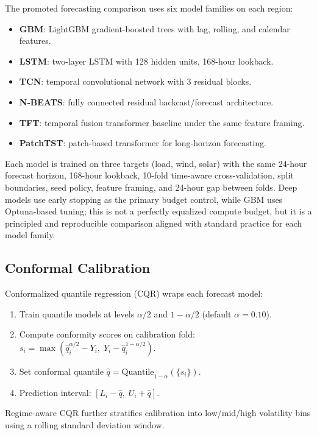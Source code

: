 \documentclass[11pt,a4paper,twocolumn]{article}
\begin{document}
The promoted forecasting comparison uses six model families on each region:
\begin{itemize}[leftmargin=*,topsep=2pt,itemsep=1pt]
  \item \textbf{GBM}: LightGBM gradient-boosted trees with lag, rolling, and calendar features.
  \item \textbf{LSTM}: two-layer LSTM with 128 hidden units, 168-hour lookback.
  \item \textbf{TCN}: temporal convolutional network with 3 residual blocks.
  \item \textbf{N-BEATS}: fully connected residual backcast/forecast architecture.
  \item \textbf{TFT}: temporal fusion transformer baseline under the same feature framing.
  \item \textbf{PatchTST}: patch-based transformer for long-horizon forecasting.
\end{itemize}
Each model is trained on three targets (load, wind, solar) with the same 24-hour forecast horizon, 168-hour lookback, 10-fold time-aware cross-validation, split boundaries, seed policy, feature framing, and 24-hour gap between folds. Deep models use early stopping as the primary budget control, while GBM uses Optuna-based tuning; this is not a perfectly equalized compute budget, but it is a principled and reproducible comparison aligned with standard practice for each model family.

\subsection{Conformal Calibration}

Conformalized quantile regression (CQR) wraps each forecast model:
\begin{enumerate}[leftmargin=*,topsep=2pt,itemsep=1pt]
  \item Train quantile models at levels $\alpha/2$ and $1-\alpha/2$ (default $\alpha=0.10$).
  \item Compute conformity scores on calibration fold: $s_i = \max(\hat{q}_i^{\alpha/2} - Y_i,\; Y_i - \hat{q}_i^{1-\alpha/2})$.
  \item Set conformal quantile $\hat{q} = \text{Quantile}_{1-\alpha}(\{s_i\})$.
  \item Prediction interval: $[L_i - \hat{q},\; U_i + \hat{q}]$.
\end{enumerate}
Regime-aware CQR further stratifies calibration into low/mid/high volatility bins using a rolling standard deviation window.
\end{document}
